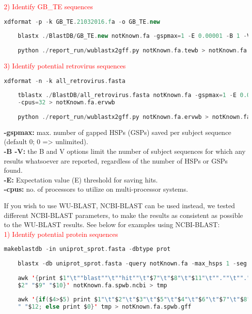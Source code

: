 \documentclass[a4paper,12pt]{article}
\begin{document}
	\noindent \textcolor{red}{2) Identify GB\_TE sequences}
	\begin{lstlisting}[language=scala]
	xdformat -p -k GB_TE.21032016.fa -o GB_TE.new
	
	blastx ./BlastDB/GB_TE.new notKnown.fa -gspmax=1 -E 0.00001 -B 1 -V 1 -cpus=32 > notKnown.fa.tewb
	
	python ./report_run/wublastx2gff.py notKnown.fa.tewb > notKnown.fa.tewb.gff \end{lstlisting}
	
	\noindent \textcolor{red}{3) Identify potential retrovirus sequences}
	\begin{lstlisting}[language=scala]
	xdformat -n -k all_retrovirus.fasta
	
	tblastx ./BlastDB/all_retrovirus.fasta notKnown.fa -gspmax=1 -E 0.00001 -B 1 -V 1 \
	-cpus=32 > notKnown.fa.ervwb
	
	python ./report_run/wublastx2gff.py notKnown.fa.ervwb > notKnown.fa.ervwb.gff \end{lstlisting}
	
	\noindent \textbf{-gspmax:} max. number of gapped HSPs (GSPs) saved per subject sequence (default 0; 0 => unlimited). \\
	\textbf{-B -V:} the B and V options limit the number of subject sequences for which any results whatsoever are reported, regardless of the number of HSPs or GSPs found. \\
	\textbf{-E:} Expectation value (E) threshold for saving hits. \\
	\textbf{-cpus:} no. of processors to utilize on multi-processor systems. \\
	
	\pagebreak
	
	\noindent If you wish to use WU-BLAST, NCBI-BLAST can be used instead, we tested different NCBI-BLAST parameters, to make the results as consistent as possible to the WU-BLAST results. See below for examples using NCBI-BLAST:\\
	
	\noindent \textcolor{red}{1) Identify potential protein sequences}
	\begin{lstlisting}[language=scala]
	makeblastdb -in uniprot_sprot.fasta -dbtype prot 
	
	blastx -db uniprot_sprot.fasta -query notKnown.fa -max_hsps 1 -seg no -evalue 0.00001 -num_threads 32 -max_target_seqs 1 -word_size 2 -outfmt 6 -out notKnown.fa.spwb.ncbi
	
	awk '{print $1"\t""blast""\t""hit""\t"$7"\t"$8"\t"$11"\t"".""\t"".""\t""Target sp|"
	$2" "$9" "$10}' notKnown.fa.spwb.ncbi > tmp
	
	awk '{if($4>$5) print $1"\t"$2"\t"$3"\t"$5"\t"$4"\t"$6"\t"$7"\t"$8"\t"$9" "$10" "$11
	" "$12; else print $0}' tmp > notKnown.fa.spwb.gff \end{lstlisting}
	
\end{document}
